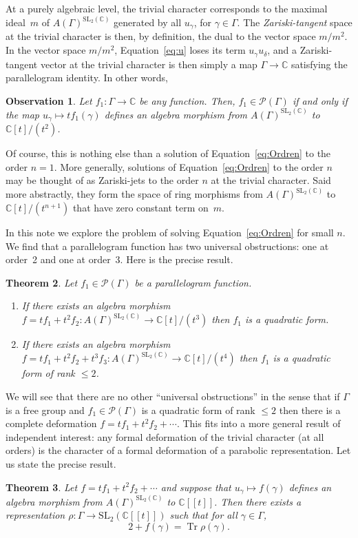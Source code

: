 \documentclass[11pt]{article}
\let\mathcal\mathscr
\newcommand{\lbr}{[\![}
\newcommand{\rbr}{]\!]}
\newtheorem{theorem}{Theorem}[section]
\newtheorem{observation}[theorem]{Observation}
\theoremstyle{definition}
\newcommand{\CC}{\mathbb{C}}
\newcommand{\tr}{\operatorname{Tr}}
\newcommand{\SL}{\mathrm{SL}}
\begin{document}
At a purely algebraic level, the trivial character corresponds to the
maximal ideal~$m$ of $A(\Gamma)^{\SL_2(\CC)}$ generated by all
$u_\gamma$, for $\gamma\in\Gamma$.
The {\em Zariski-tangent} space at the trivial character is then, by
definition, the dual to the vector space $m/m^2$.
In the vector space $m/m^2$, Equation~\eqref{eq:u} loses its term
$u_\gamma u_\delta$, and a Zariski-tangent vector at the trivial
character is then simply a map $\Gamma\to\CC$ satisfying the parallelogram
identity.
In other words,
\begin{observation}
Let $f_1\colon\Gamma\to\CC$ be any function.
Then, $f_1\in\mathcal{P}(\Gamma)$ if and only if the map
$u_\gamma\mapsto tf_1(\gamma)$ defines an algebra morphism from
$A(\Gamma)^{\SL_2(\CC)}$ to $\CC[t]/(t^2)$.
\end{observation}
Of course, this is nothing else than a solution of
Equation~\eqref{eq:Ordren} to the order $n=1$.
More generally, solutions of Equation~\eqref{eq:Ordren} to the order $n$
may be thought of as Zariski-jets
to the order $n$
at the trivial character.
Said more abstractly, they form the space of ring morphisms from
$A(\Gamma)^{\SL_2(\CC)}$ to $\CC[t]/(t^{n+1})$ that have zero constant term
on~$m$.

In this note we explore the problem of solving Equation~\eqref{eq:Ordren}
for small $n$. We find that a parallelogram function has two universal
obstructions: one at order~2 and one at order~3. Here is the precise result.
\begin{theorem}\label{theo:obstruction}
Let $f_1\in \mathcal{P}(\Gamma)$ be a parallelogram function.
\begin{enumerate}
\item If there exists an algebra morphism
$f=tf_1+t^2f_2:A(\Gamma)^{\SL_2(\CC)}\to \CC[t]/(t^3)$
then $f_1$ is a quadratic form.
\item If there exists an algebra morphism
$f=tf_1+t^2f_2+t^3f_3:A(\Gamma)^{\SL_2(\CC)}\to \CC[t]/(t^4)$
then $f_1$ is a quadratic form of rank $\leq 2$.
\end{enumerate}
\end{theorem}

We will see that there are no other ``universal obstructions'' in the sense
that if $\Gamma$ is a free group and $f_1\in \mathcal{P}(\Gamma)$ is a
quadratic form of rank $\leq 2$ then there is a complete deformation
$f=tf_1+t^2f_2+\cdots$. This fits into a more general result of independent
interest: any formal deformation of the trivial character (at all orders)
is the character of a formal deformation of a parabolic representation.
Let us state the precise result.
\begin{theorem}\label{theo:lifting}
Let $f=tf_1+t^2 f_2+\cdots$
and suppose that $u_\gamma\mapsto f(\gamma)$ defines an algebra morphism
from $A(\Gamma)^{\SL_2(\CC)}$ to $\CC\lbr t\rbr$. Then there
exists a representation $\rho\colon\Gamma\to \SL_2(\CC\lbr t\rbr)$ such that
for all $\gamma\in \Gamma$,
\[
2+f(\gamma)=\tr \rho(\gamma).
\]
\end{theorem}
\end{document}
